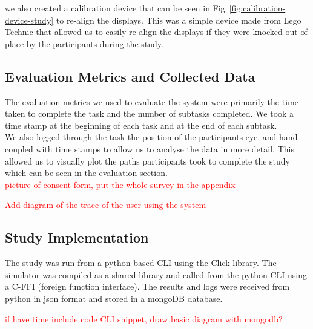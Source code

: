 we also created a calibration device that can be seen in Fig~\ref{fig:calibration-device-study} to re-align the displays. This was a simple device made from Lego Technic \tocite that allowed us to easily re-align the displays if they were knocked out of place by the participants during the study.

\subsection{Evaluation Metrics and Collected Data}
The evaluation metrics we used to evaluate the system were primarily the time taken to complete the task and the number of subtasks completed. We took a time stamp at the beginning of each task and at the end of each subtask. \\

We also logged through the task the position of the participants eye, and hand coupled with time stamps to allow us to analyse the data in more detail. This allowed us to visually plot the paths participants took to complete the study which can be seen in the evaluation section. \\

\textcolor{red}{picture of consent form, put the whole survey in the appendix}

\textcolor{red}{Add diagram of the trace of the user using the system}

\subsection{Study Implementation}

The study was run from a python based CLI using the Click library. The simulator was compiled as a shared library and called from the python CLI using a C-FFI (foreign function interface). The results and logs were received from python in json format and stored in a mongoDB database.

\textcolor{red}{if have time include code CLI snippet, draw basic diagram with mongodb?}
